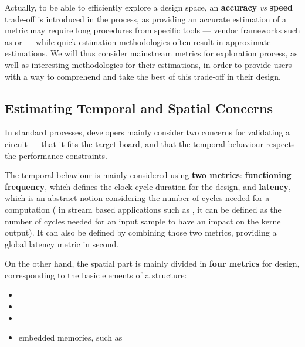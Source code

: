     Actually, to be able to efficiently explore a design space, an {\bf accuracy} {\it vs} {\bf speed} trade-off is introduced in the process, as providing an accurate estimation of a metric may require long procedures from specific tools --- \eg vendor frameworks such as \vivado{} or \quartus{} --- while quick estimation methodologies often result in approximate estimations.
    We will thus consider mainstream metrics for exploration process, as well as interesting methodologies for their estimations, in order to provide users with a way to comprehend and take the best of this trade-off in their  design.
    
    \subsection{Estimating Temporal and Spatial Concerns}
    \label{ch.state:sec.metric:ssec.resource}
        In standard  processes, developers mainly consider two concerns for validating a circuit --- that it fits the target board, and that the temporal behaviour respects the performance constraints.

        The temporal behaviour is mainly considered using {\bf two metrics}: {\bf functioning frequency}, which defines the clock cycle duration for the design, and {\bf latency}, which is an abstract notion considering the number of cycles needed for a computation (\eg{} in stream based applications such as , it can be defined as the number of cycles needed for an input sample to have an impact on the kernel output).
        It can also be defined by combining those two metrics, providing a global latency metric in second.

        On the other hand, the spatial part is mainly divided in {\bf four metrics} for  design, corresponding to the basic elements of a  structure:
        \begin{itemize}
            \item {}%
            \item {}%
            \item {}%
            \item embedded memories, such as %
        \end{itemize}

